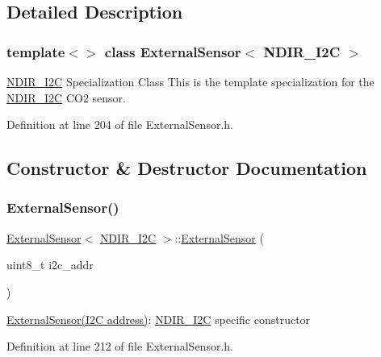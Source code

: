 \subsection{Detailed Description}
\subsubsection*{template$<$$>$\newline
class External\+Sensor$<$ N\+D\+I\+R\+\_\+\+I2\+C $>$}

\hyperlink{class_n_d_i_r___i2_c}{N\+D\+I\+R\+\_\+\+I2C} Specialization Class This is the template specialization for the \hyperlink{class_n_d_i_r___i2_c}{N\+D\+I\+R\+\_\+\+I2C} C\+O2 sensor. 

Definition at line 204 of file External\+Sensor.\+h.



\subsection{Constructor \& Destructor Documentation}
\mbox{\label{class_external_sensor_3_01_n_d_i_r___i2_c_01_4_aa06970ea689679c0e1deb5360e05a0a4}} 
\subsubsection{\texorpdfstring{External\+Sensor()}{ExternalSensor()}}
{\footnotesize\ttfamily \hyperlink{class_external_sensor}{External\+Sensor}$<$ \hyperlink{class_n_d_i_r___i2_c}{N\+D\+I\+R\+\_\+\+I2C} $>$\+::\hyperlink{class_external_sensor}{External\+Sensor} (\begin{DoxyParamCaption}\item[{uint8\+\_\+t}]{i2c\+\_\+addr }\end{DoxyParamCaption})\hspace{0.3cm}{\ttfamily [inline]}}

\hyperlink{class_external_sensor}{External\+Sensor(\+I2\+C address)}\+: \hyperlink{class_n_d_i_r___i2_c}{N\+D\+I\+R\+\_\+\+I2C} specific constructor 

Definition at line 212 of file External\+Sensor.\+h.


